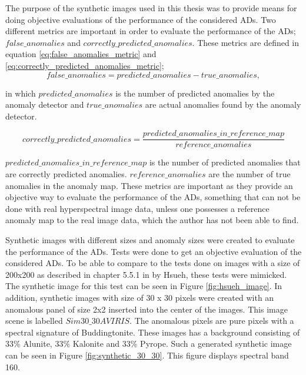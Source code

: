 The purpose of the synthetic images used in this thesis was to provide means for doing objective evaluations of the performance of the considered ADs. Two different metrics are important in order to evaluate the performance of the ADs; $false\_anomalies$ and $correctly\_predicted\_anomalies$. These metrics are defined in equation \ref{eq:false_anomalies_metric} and \ref{eq:correctly_predicted_anomalies_metric};
\begin{equation}
    false\_anomalies = predicted\_anomalies - true\_anomalies,
    \label{eq:false_anomalies_metric}
\end{equation}

in which $predicted\_anomalies$ is the number of predicted anomalies by the anomaly detector and $true\_anomalies$ are actual anomalies found by the anomaly detector.


\begin{equation}
    correctly\_predicted\_anomalies= \frac{predicted\_anomalies\_in\_reference\_map}{reference\_anomalies}
    \label{eq:correctly_predicted_anomalies_metric}
\end{equation}

$predicted\_anomalies\_in\_reference\_map$ is the number of predicted anomalies that are correctly predicted anomalies. $reference\_anomalies$ are the number of true anomalies in the anomaly map. These metrics are important as they provide an objective way to evaluate the performance of the ADs, something that can not be done with real hyperspectral image data, unless one possesses a reference anomaly map to the real image data, which the author has not been able to find.  



Synthetic images with different sizes and anomaly sizes were created to evaluate the performance of the ADs. Tests were done to get an objective evaluation of the considered ADs. To be able to compare to the tests done on images with a size of 200x200 as described in chapter 5.5.1 in \cite{hsueh_master_thesis} by Hsueh, these tests were mimicked. The synthetic image for this test can be seen in Figure \ref{fig:hsueh_image}. In addition, synthetic images with size of 30 x 30 pixels were created with an anomalous panel of size 2x2 inserted into the center of the images. This image scene is labelled $Sim30\_30AVIRIS$. The anomalous pixels are pure pixels with a spectral signature of Buddingtonite. These images has a background consisting of $33\%$ Alunite, $33\%$ Kalonite and $33\%$ Pyrope. Such a generated synthetic image can be seen in Figure \ref{fig:synthetic_30_30}. This figure displays spectral band 160.


